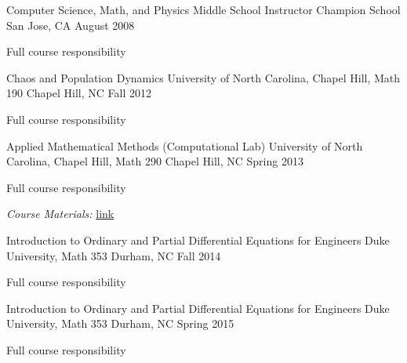 
\begin{cventries}

  \cventry
    {Computer Science, Math, and Physics Middle School Instructor} %
    {Champion School} %
    {San Jose, CA} %
    {August 2008} %
     {
         \begin{cvitems} %
      \item {Full course responsibility}
          \end{cvitems}
     }


  \cventry
    {Chaos and Population Dynamics } %
    {University of North Carolina, Chapel Hill, Math 190} %
    {Chapel Hill, NC} %
    {Fall 2012} %
     {
         \begin{cvitems} %
    \item {Full course responsibility}
        \end{cvitems}
     }

  \cventry
    {Applied Mathematical Methods (Computational Lab)} %
    {University of North Carolina, Chapel Hill, Math 290} %
    {Chapel Hill, NC} %
    {Spring 2013} %
     {
    \begin{cvitems} %
    \item {Full course responsibility}
    \item {\textit{Course Materials:} \href{https://github.com/ajbaird/computational_math}{link}}
    \end{cvitems}
     }


  \cventry
    {Introduction to Ordinary and Partial Differential Equations for Engineers} %
    {Duke University, Math 353} %
    {Durham, NC} %
    {Fall 2014} %
     {
    \begin{cvitems} %
    \item {Full course responsibility}
    \end{cvitems}
     }


  \cventry
    {Introduction to Ordinary and Partial Differential Equations for Engineers} %
    {Duke University, Math 353} %
    {Durham, NC} %
    {Spring 2015} %
     {
    \begin{cvitems} %
    \item {Full course responsibility}
    \end{cvitems}
     }



\end{cventries}
